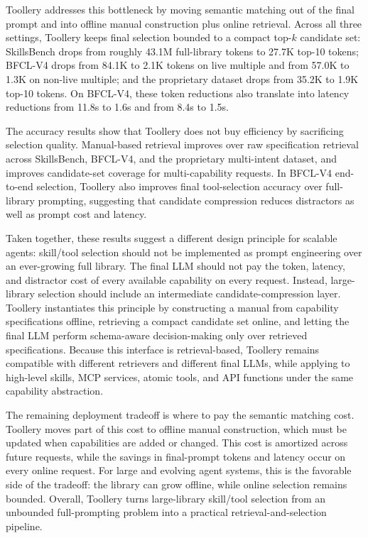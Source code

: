 \documentclass[11pt]{article}
\begin{document}
Toollery addresses this bottleneck by moving semantic matching out of the final prompt and into offline manual construction plus online retrieval. Across all three settings, Toollery keeps final selection bounded to a compact top-$k$ candidate set: SkillsBench drops from roughly 43.1M full-library tokens to 27.7K top-10 tokens; BFCL-V4 drops from 84.1K to 2.1K tokens on live multiple and from 57.0K to 1.3K on non-live multiple; and the proprietary dataset drops from 35.2K to 1.9K top-10 tokens. On BFCL-V4, these token reductions also translate into latency reductions from 11.8s to 1.6s and from 8.4s to 1.5s. 

The accuracy results show that Toollery does not buy efficiency by sacrificing selection quality. Manual-based retrieval improves over raw specification retrieval across SkillsBench, BFCL-V4, and the proprietary multi-intent dataset, and improves candidate-set coverage for multi-capability requests. In BFCL-V4 end-to-end selection, Toollery also improves final tool-selection accuracy over full-library prompting, suggesting that candidate compression reduces distractors as well as prompt cost and latency.

Taken together, these results suggest a different design principle for scalable agents: skill/tool selection should not be implemented as prompt engineering over an ever-growing full library. The final LLM should not pay the token, latency, and distractor cost of every available capability on every request. Instead, large-library selection should include an intermediate candidate-compression layer. Toollery instantiates this principle by constructing a manual from capability specifications offline, retrieving a compact candidate set online, and letting the final LLM perform schema-aware decision-making only over retrieved specifications. Because this interface is retrieval-based, Toollery remains compatible with different retrievers and different final LLMs, while applying to high-level skills, MCP services, atomic tools, and API functions under the same capability abstraction.

The remaining deployment tradeoff is where to pay the semantic matching cost. Toollery moves part of this cost to offline manual construction, which must be updated when capabilities are added or changed. This cost is amortized across future requests, while the savings in final-prompt tokens and latency occur on every online request. For large and evolving agent systems, this is the favorable side of the tradeoff: the library can grow offline, while online selection remains bounded. Overall, Toollery turns large-library skill/tool selection from an unbounded full-prompting problem into a practical retrieval-and-selection pipeline.
\end{document}
